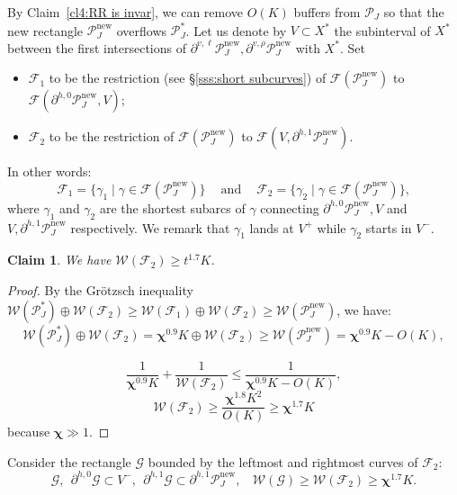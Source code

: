 \documentclass{amsart}
\renewcommand{\sp}{{\ \ }}
\newcommand{\1}{{\mathbb 1 }}
\newcommand{\reminder}[1]{\textsl{$\lhd\rhd$#1$\lhd\rhd$}\marginpar{$\lhd\rhd\lhd\rhd\lhd\rhd$}}
\newcommand{\FamG}{{\mathcal G}}
\newcommand{\Fam}{{\mathcal F}}
\newcommand{\Width}{{\mathcal W}}
\newcommand\PP{\mathcal{P}}
\newcommand\new{{\operatorname{new}}}
\newtheorem{claim4}{Claim}
\theoremstyle{remark}
\numberwithin{equation}{section}
\theoremstyle{definition}
\newcommand{\bchi}{{\boldsymbol{ \chi}}}
\begin{document}
By Claim~\ref{cl4:RR is invar}, we can remove $O(K)$ buffers from $\PP_J$ so that the new rectangle $\PP^\new_J$ overflows $\PP^*_J$. Let us denote by $V\subset X^*$ the subinterval of $X^*$ between the first intersections of $\partial^{v, \ell}\PP_J^\new, \partial^{v, \rho}\PP_J^\new$ with $X^*$. Set 
\begin{itemize}
\item $\Fam_1$ to be the restriction (see \S\ref{sss:short subcurves}) of $\Fam(\PP^\new_J)$ to $\Fam(\partial ^{h,0} \PP^\new_J, V)$; 
\item $\Fam_2$ to be the restriction of $\Fam(\PP^\new_J)$ to $\Fam(V,\partial ^{h,1} \PP^\new_J)$.
\end{itemize}
In other words:
\[ \Fam_1=\{\gamma_1\mid \gamma \in \Fam(\PP^\new_J)\}\sp\sp\text{ and }\sp\sp \Fam_2=\{\gamma_2\mid \gamma \in \Fam(\PP^\new_J)\},\]
where $\gamma_1$ and $\gamma_2$ are the shortest subarcs of $\gamma$ connecting $\partial ^{h,0} \PP^\new_J, V$ and $V,\partial ^{h,1} \PP^\new_J$ respectively. We remark that $\gamma_1$ lands at $V^+$ while $\gamma_2$ starts in $V^-$.




\begin{claim4}
We have $\Width(\Fam_2)\ge t^{1.7}K$.
\end{claim4}
\begin{proof}
By the Gr\"otzsch inequality $\Width(\PP^*_J) \oplus  \Width(\Fam_2)\ge \Width(\Fam_1) \oplus  \Width(\Fam_2)  \ge  \Width(\PP^\new_J)$, we have: \[\Width(\PP^*_J) \oplus  \Width(\Fam_2) = \bchi^{0.9} K \oplus \Width(\Fam_2)\ge  \Width(\PP^\new_J) =\bchi^{0.9}K -O(K),\]

\[ \frac{1}{ \bchi^{0.9} K}+ \frac{1}{ \Width(\Fam_2)} \le  \frac{1}{\bchi^{0.9}K -O(K)},\]
\[\Width(\Fam_2) \ge \frac{\bchi^{1.8}K^2}{ O(K)} \ge \bchi^{1.7}K\]
because $\bchi\gg 1$.
\end{proof}

Consider the rectangle $\FamG$ bounded by the leftmost and rightmost curves of $\Fam_2$:
\[ \FamG, \sp \partial^{h,0}\FamG\subset V^-, \sp \partial^{h,1}\FamG\subset \partial^{h,1} \PP^\new_J,\sp\sp  \Width(\FamG)\ge \Width(\Fam_2)\ge \bchi^{1.7}K.\]
\end{document}
